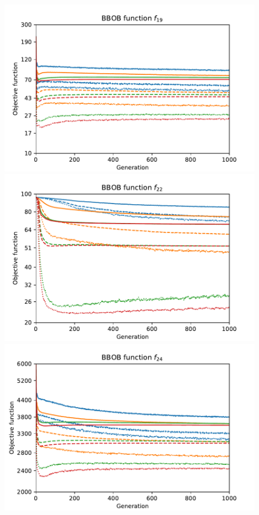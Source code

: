 \begin{figure}[ht!]
    \centering
    \begin{minipage}[t]{0.32\textwidth}
        \centering
        \includegraphics[width=\textwidth]{img/runs/fitness_pso2011_f19.pdf}
    \end{minipage}
    \hfill
    \begin{minipage}[t]{0.32\textwidth}
        \centering
        \includegraphics[width=\textwidth]{img/runs/fitness_pso2011_f22.pdf}
    \end{minipage}
    \hfill
    \begin{minipage}[t]{0.32\textwidth}
        \centering
        \includegraphics[width=\textwidth]{img/runs/fitness_pso2011_f24.pdf}
    \end{minipage}


\end{figure}
